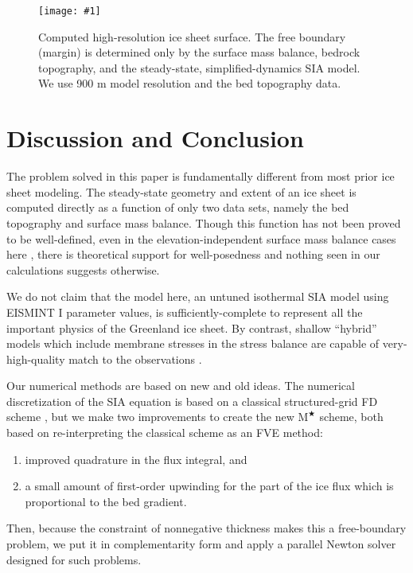 \documentclass[review,letterpaper]{igs}
\newcommand{\onecol}[1]{\texttt{[image: \#1]}}
\newcommand{\Mstar}{$\text{M}^{\bigstar}$\xspace}
\begin{document}
\begin{figure}[ht]
\onecol{grnwinset.pdf}
\caption{Computed high-resolution ice sheet surface.  The free boundary (margin) is determined only by the surface mass balance, bedrock topography, and the steady-state, simplified-dynamics SIA model.  We use 900 m model resolution and the \MCB bed topography data.}
\label{fig:grnwinset}
\end{figure}


\section{Discussion and Conclusion}

The problem solved in this paper is fundamentally different from most prior ice sheet modeling.  The steady-state geometry and extent of an ice sheet is computed directly as a function of only two data sets, namely the bed topography and surface mass balance.  Though this function has not been proved to be well-defined, even in the elevation-independent surface mass balance cases here \citep[compare][]{Jouvetetal2011}, there is theoretical support for well-posedness \citep{JouvetBueler2012} and nothing seen in our calculations suggests otherwise.

We do not claim that the model here, an untuned isothermal SIA model using EISMINT I parameter values, is sufficiently-complete to represent all the important physics of the Greenland ice sheet.  By contrast, shallow ``hybrid'' models which include membrane stresses in the stress balance are capable of very-high-quality match to the observations \citep{Aschwandenetal2015}.

Our numerical methods are based on new and old ideas.  The numerical discretization of the SIA equation is based on a classical structured-grid FD scheme \citep{Mahaffy1976}, but we make two improvements to create the new \Mstar scheme, both based on re-interpreting the classical scheme as an FVE method:
\renewcommand{\labelenumi}{\emph{(\roman{enumi})}}
\begin{enumerate}
\item improved quadrature in the flux integral, and
\item a small amount of first-order upwinding for the part of the ice flux which is proportional to the bed gradient.
\end{enumerate}
Then, because the constraint of nonnegative thickness makes this a free-boundary problem, we put it in complementarity form and apply a parallel Newton solver designed for such problems.
\end{document}
